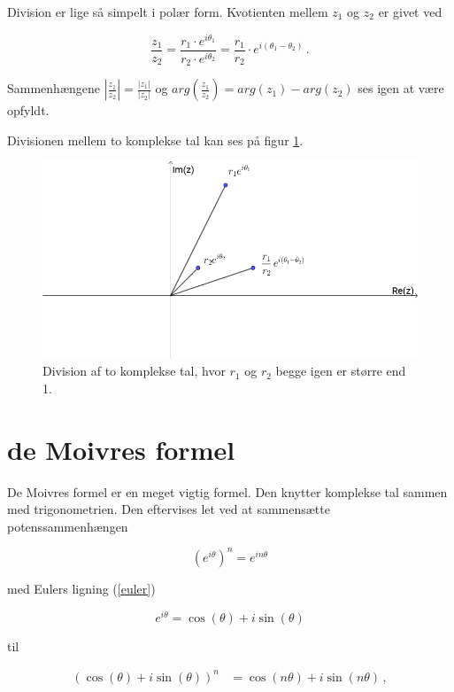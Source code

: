 \documentclass[a4paper, 12pt,titlepage]{article}
\begin{document}
Division er lige så simpelt i polær form. Kvotienten mellem \(z_1\) og \(z_2\) er givet ved

\begin{equation}
	\frac{z_1}{z_2} = \frac{r_1 \cdot e^{i\theta_1}}{r_2 \cdot e^{i\theta_2}} = \frac{r_1}{r_2} \cdot e^{i (\theta_1 - \theta_2)} \,.
\end{equation}

Sammenhængene \(\left\lvert \frac{z_1}{z_2} \right\rvert = \frac{|z_1|}{|z_2|}\) og \(arg\left(\frac{z_1}{z_2}\right) =arg(z_1)-arg(z_2)\) ses igen at være opfyldt.

Divisionen mellem to komplekse tal kan ses på figur \ref{polaer_divi}.

\begin{figure}[htbp]
\centering
\includegraphics[width=.9\linewidth]{./img/polaer_divi.png}
\caption{\label{polaer_divi}Division af to komplekse tal, hvor \(r_1\) og \(r_2\) begge igen er større end 1.}
\end{figure}

\section{de Moivres formel}
\label{sec:orgdb026a7}

De Moivres formel er en meget vigtig formel. Den knytter komplekse tal sammen med trigonometrien. Den eftervises let ved at sammensætte potenssammenhængen

$$\left(e^{i\theta}\right)^n = e^{i n \theta}$$

med Eulers ligning (\ref{euler})

$$e^{i\theta} = \cos(\theta) + i \sin(\theta)$$

til 

\begin{align}
\left(\cos(\theta) + i \sin(\theta)\right)^n &= \cos(n\theta) + i \sin(n\theta)\,,  
\end{align}
\end{document}
